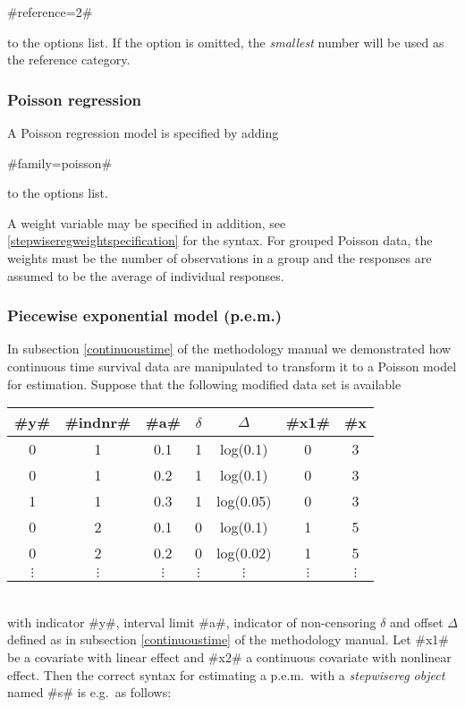 #reference=2#

to the options list. If the option is omitted, the {\em smallest}
number will be used as the reference category.


\subsubsection*{Poisson regression}

A Poisson regression model is specified by adding

#family=poisson#

to the options list.

A weight variable may be specified in addition, see
\autoref{stepwiseregweightspecification} for the syntax. For grouped Poisson
data, the weights must be the number of observations in a group and
the responses are assumed to be the average of individual responses.


\subsubsection*{Piecewise exponential model
(p.e.m.)}

In subsection \ref*{continuoustime} of the methodology manual we
demonstrated how continuous time survival data are manipulated
to transform it to a Poisson model for estimation. Suppose that the
following modified data set is available
\vspace{0.5cm}\\
\begin{tabular}{c|c|c|c|c|c|c}
#y# & #indnr# & #a# & $\delta$ &  $\Delta$ &   #x1# &
#x#2\\\hline\hline
0 &  1 &   0.1 &   1  &  log(0.1) & 0  & 3\\
0  & 1   & 0.2  &  1  &  log(0.1) & 0 &  3\\
1  & 1   & 0.3  &  1  &  log(0.05)& 0  & 3\\\hline
0 &  2 &   0.1 &   0 &   log(0.1) & 1 &  5\\
0  & 2  &  0.2 &   0  &  log(0.02)& 1 &  5\\\hline
$\vdots$ & $\vdots$ & $\vdots$ & $\vdots$ & $\vdots$ & $\vdots$& $\vdots$\\
\end{tabular}
\vspace{0.5cm}\\
with indicator #y#, interval limit #a#, indicator of non-censoring
$\delta$ and offset $\Delta$ defined as in subsection
\ref*{continuoustime} of the methodology manual. Let #x1# be a
covariate with linear effect and #x2# a continuous covariate with
nonlinear effect. Then the correct syntax for estimating a
p.e.m.~with a {\em stepwisereg object} named #s# is e.g.~as follows:

